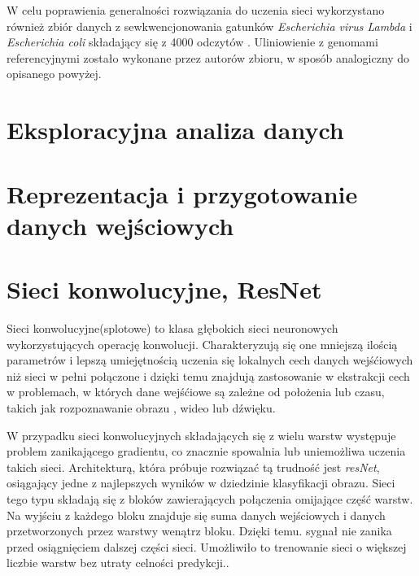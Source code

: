 \documentclass[a4paper,11pt,twoside]{report}
\theoremstyle{definition}
\begin{document}
W celu poprawienia generalności rozwiązania do uczenia sieci wykorzystano również zbiór danych z sewkwencjonowania gatunków \textit{Escherichia virus Lambda} i \textit{Escherichia coli} składający się z 4000 odczytów \cite{chironData}. Uliniowienie z genomami referencyjnymi zostało wykonane przez autorów zbioru, w sposób analogiczny do opisanego powyżej.

\section*{Eksploracyjna analiza danych}

\section*{Reprezentacja i przygotowanie danych wejściowych}

\section*{Sieci konwolucyjne, ResNet}

Sieci konwolucyjne(splotowe) to klasa głębokich sieci neuronowych wykorzystujących operację konwolucji. Charakteryzują się one mniejszą ilością parametrów i lepszą umiejętnością uczenia się lokalnych cech danych wejśćiowych niż sieci w pełni połączone\cite{cnn} i dzięki temu znajdują zastosowanie w ekstrakcji cech w problemach, w których dane wejśćiowe są zależne od położenia lub czasu, takich jak rozpoznawanie obrazu \cite{vgg}, wideo\cite{cnnVideo} lub dźwięku\cite{cnnAudio}.

W przypadku sieci konwolucyjnych składających się z wielu warstw występuje problem zanikającego gradientu, co znacznie spowalnia lub uniemożliwa uczenia takich sieci\cite{difficulty}.
Architekturą, która próbuje rozwiązać tą trudność jest \textit{resNet}, osiągający jedne z najlepszych wyników w dziedzinie klasyfikacji obrazu. Sieci tego typu składają się z bloków zawierających połączenia omijające część warstw. Na wyjściu z każdego bloku znajduje się suma danych wejściowych i danych przetworzonych przez warstwy wenątrz bloku. Dzięki temu. sygnał nie zanika przed osiągnięciem dalszej części sieci. Umożliwiło to trenowanie sieci o większej liczbie warstw bez utraty celności predykcji.\cite{resnet}.
\end{document}
